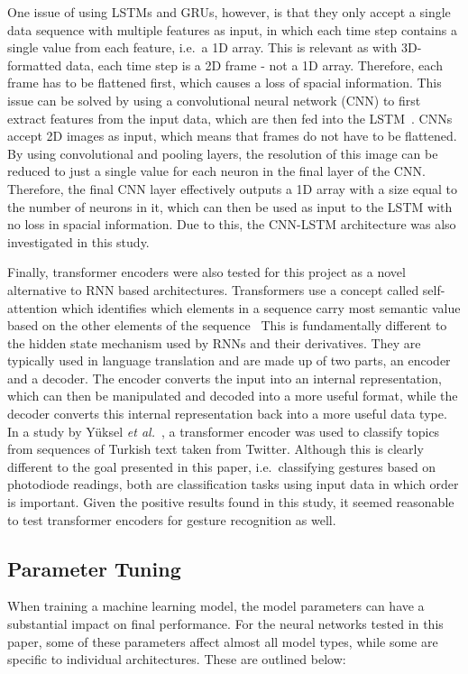 One issue of using LSTMs and GRUs, however, is that they only accept a single data sequence with multiple features as input, in which each time step contains a single value from each feature, i.e.\ a 1D array.
This is relevant as with 3D-formatted data, each time step is a 2D frame - not a 1D array.
Therefore, each frame has to be flattened first, which causes a loss of spacial information.
This issue can be solved by using a convolutional neural network (CNN) to first extract features from the input data, which are then fed into the LSTM~\cite{KIM201972}.
CNNs accept 2D images as input, which means that frames do not have to be flattened.
By using convolutional and pooling layers, the resolution of this image can be reduced to just a single value for each neuron in the final layer of the CNN\@.
Therefore, the final CNN layer effectively outputs a 1D array with a size equal to the number of neurons in it, which can then be used as input to the LSTM with no loss in spacial information.
Due to this, the CNN-LSTM architecture was also investigated in this study.

Finally, transformer encoders were also tested for this project as a novel alternative to RNN based architectures.
Transformers use a concept called self-attention which identifies which elements in a sequence carry most semantic value based on the other elements of the sequence~\cite{https://doi.org/10.48550/arxiv.1706.03762}
This is fundamentally different to the hidden state mechanism used by RNNs and their derivatives.
They are typically used in language translation and are made up of two parts, an encoder and a decoder.
The encoder converts the input into an internal representation, which can then be manipulated and decoded into a more useful format, while the decoder converts this internal representation back into a more useful data type.
In a study by Y{\"u}ksel \textit{et al.}~\cite{yuksel-etal-2019-turkish}, a transformer encoder was used to classify topics from sequences of Turkish text taken from Twitter.
Although this is clearly different to the goal presented in this paper, i.e.\ classifying gestures based on photodiode readings, both are classification tasks using input data in which order is important.
Given the positive results found in this study, it seemed reasonable to test transformer encoders for gesture recognition as well.

\subsection{Parameter Tuning}\label{subsec:frame-size}
When training a machine learning model, the model parameters can have a substantial impact on final performance.
For the neural networks tested in this paper, some of these parameters affect almost all model types, while some are specific to individual architectures.
These are outlined below:

